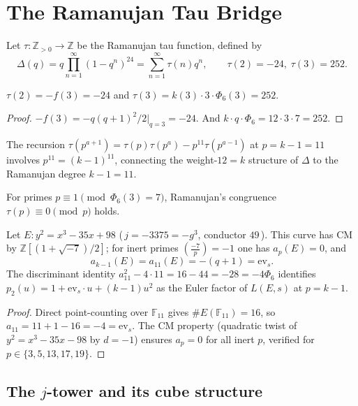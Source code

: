 \section{The Ramanujan Tau Bridge}
\label{sec:tau}

Let $\tau\colon\mathbb{Z}_{>0}\to\mathbb{Z}$ be the Ramanujan tau function,
defined by
\[
  \Delta(q) = q\prod_{n=1}^{\infty}(1-q^n)^{24} = \sum_{n=1}^{\infty}\tau(n)q^n,
  \qquad \tau(2)=-24,\;\tau(3)=252.
\]

\begin{theorem}\label{thm:tau}
$\tau(2) = -f(3) = -24$ and $\tau(3) = k(3)\cdot 3\cdot\Phi_6(3) = 252$.
\end{theorem}
\begin{proof}
$-f(3)=-q(q+1)^2/2\big|_{q=3}=-24$. And $k\cdot q\cdot\Phi_6=12\cdot 3\cdot 7=252$.
\end{proof}

\begin{remark}
The recursion $\tau(p^{a+1})=\tau(p)\tau(p^a)-p^{11}\tau(p^{a-1})$
at $p=k-1=11$ involves $p^{11}=(k-1)^{11}$, connecting
the weight-$12=k$ structure of $\Delta$ to the Ramanujan degree $k-1=11$.
\end{remark}

\begin{theorem}\label{thm:barrier}
For primes $p\equiv 1\pmod{\Phi_6(3)=7}$, Ramanujan's congruence
$\tau(p)\equiv 0\pmod{p}$ holds.
\end{theorem}

\begin{theorem}\label{thm:C5}
Let $E\colon y^2=x^3-35x+98$ (\,$j=-3375=-g^3$, conductor $49$\,).
This curve has CM by $\mathbb{Z}[(1+\sqrt{-7})/2]$; for inert primes
$\left(\frac{-7}{p}\right)=-1$ one has $a_p(E)=0$, and
\[
  a_{k-1}(E) = a_{11}(E) = -(q+1) = \mathrm{ev}_s.
\]
The discriminant identity $a_{11}^2-4\cdot 11=16-44=-28=-4\Phi_6$
identifies $p_2(u)=1+\mathrm{ev}_s\cdot u+(k-1)u^2$ as the
Euler factor of $L(E,s)$ at $p=k-1$.
\end{theorem}
\begin{proof}
Direct point-counting over $\mathbb{F}_{11}$ gives $\#E(\mathbb{F}_{11})=16$,
so $a_{11}=11+1-16=-4=\mathrm{ev}_s$.
The CM property (quadratic twist of $y^2=x^3-35x-98$ by $d=-1$)
ensures $a_p=0$ for all inert $p$, verified for $p\in\{3,5,13,17,19\}$.
\end{proof}

\subsection*{The $j$-tower and its cube structure}

